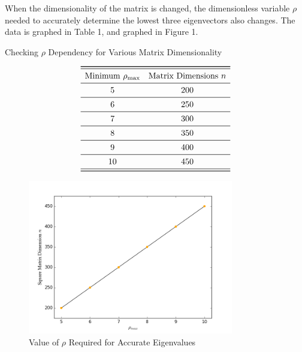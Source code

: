 \documentclass[11pt]{article}
\begin{document}

    When the dimensionality of the matrix is changed, the  dimensionless variable $\rho$ needed to accurately determine the lowest three eigenvectors also changes. The data is graphed in Table 1, and graphed in Figure 1.

    \begin{table}[H]
    \caption{Checking $\rho$ Dependency for Various Matrix Dimensionality}
    \[
    \begin{array}{cc}
    \toprule \midrule
     \text{Minimum } \rho_\text{max} & \text{Matrix Dimensions } n  \\ \midrule
    5 & 200 \\ \midrule
    6 & 250 \\ \midrule
    7 & 300 \\ \midrule
    8 & 350 \\ \midrule
    9 & 400 \\ \midrule
    10 & 450 \\ \midrule
    \bottomrule
    \end{array}
    \]
    \end{table}



    \begin{figure}[H] \begin{center}
    \includegraphics[width=0.8\textwidth]{../Code/RhoDepend.png}
    \end{center} \caption{Value of $\rho$ Required for Accurate Eigenvalues} \end{figure}
\end{document}
